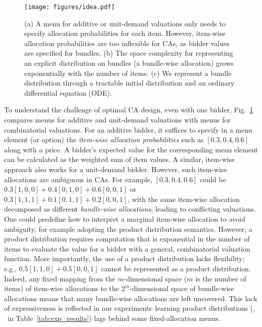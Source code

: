 \begin{figure}
    \centering
    \texttt{[image: figures/idea.pdf]}
    \caption{(a) A menu for additive or unit-demand valuations only needs to specify allocation probabilities for each item. However, item-wise allocation probabilities are  too inflexible
    for CAs, as bidder values are specified for bundles. (b) The space complexity for representing an explicit distribution on bundles (a bundle-wise allocation) grows exponentially with the number of items. (c) We represent a bundle distribution
    through a tractable initial distribution and an ordinary differential equation (ODE). 
    \label{fig:idea}}
\end{figure}
To understand the challenge of optimal CA design, even with one bidder, 
Fig.~\ref{fig:idea} compares  menus for additive and unit-demand valuations with menus for combinatorial valuations.
For an additive bidder, it suffices to specify in a menu element (or option) the \emph{item-wise allocation probabilities} such as $[0.3, 0.4, 0.6]$ along with a price. A bidder's  expected value for the corresponding menu element can be calculated as the weighted sum of item values. A similar, item-wise  approach also works for a unit-demand bidder.
However, such item-wise allocations are ambiguous in CAs.
For example, $[0.3, 0.4, 0.6]$ could be $0.3[1,0,0]+0.4[0,1,0]+0.6[0,0,1]$ or
$0.3[1,1,1]+0.1[0,1,1]+0.2[0,0,1]$, with the same item-wise allocation  decomposed as different \emph{bundle-wise allocations}, leading to conflicting valuations. One could predefine how to interpret a marginal item-wise allocation to avoid ambiguity, for example adopting the product distribution semantics. However, a product distribution requires computation that is exponential in the number of items to evaluate the value for a bidder with a general, combinatorial valuation function. More importantly, the use of a product distribution lacks flexibility; e.g.,  $0.5[1,1,0]+0.5[0,0,1]$ cannot be represented as a product distribution. Indeed, any fixed mapping from the $m$-dimensional space ($m$ is the number of items) of item-wise allocations to the $2^m$-dimensional space of bundle-wise allocations means that many bundle-wise allocations are left uncovered. This lack of expressiveness is reflected in our experiments--learning product distributions (\eg, \bundle~in Table~\ref{tab:exp_results}) lags behind some fixed-allocation menus.


